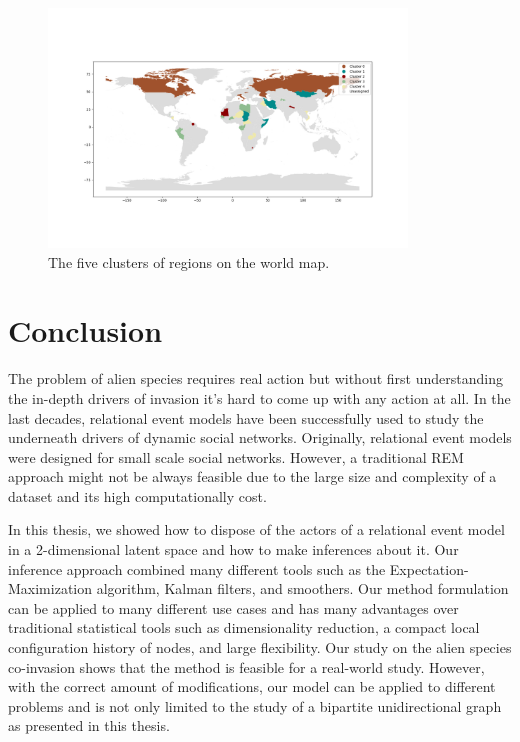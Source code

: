 \documentclass[mscthesis]{usiinfthesis}
\begin{document}
\begin{figure}[ht]
    \centering
    \includegraphics[width=0.85\textwidth]{region_geospatial_cluster.png}
    \caption{The five clusters of regions on the world map.}
    \label{fig:worldmap_cluster}
\end{figure}




\chapter{Conclusion}

The problem of alien species requires real action but without first understanding the in-depth drivers of invasion it's hard to come up with any action at all. In the last decades, relational event models have been successfully used to study the underneath drivers of dynamic social networks. Originally, relational event models were designed for small scale social networks. However, a traditional REM approach might not be always feasible due to the large size and complexity of a dataset and its high computationally cost.

In this thesis, we showed how to dispose of the actors of a relational event model in a 2-dimensional latent space and how to make inferences about it. Our inference approach combined many different tools such as the Expectation-Maximization algorithm, Kalman filters, and smoothers. Our method formulation can be applied to many different use cases and has many advantages over traditional statistical tools such as dimensionality reduction, a compact local configuration history of nodes, and large flexibility. Our study on the alien species co-invasion shows that the method is feasible for a real-world study. However, with the correct amount of modifications, our model can be applied to different problems and is not only limited to the study of a bipartite unidirectional graph as presented in this thesis. 
\end{document}
